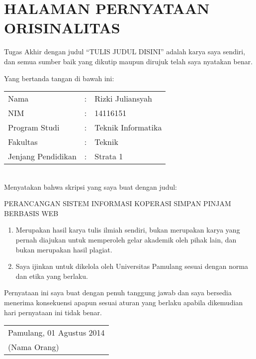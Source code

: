 %

\chapter*{\uppercase{HALAMAN PERNYATAAN ORISINALITAS}}
\vspace{1cm}
\noindent Tugas Akhir dengan judul “TULIS JUDUL DISINI” adalah karya saya sendiri, dan semua sumber baik yang dikutip maupun dirujuk telah saya nyatakan benar.

\noindent Yang bertanda tangan di bawah ini:
\renewcommand{\arraystretch}{1.5}
\begin{table}[ht]
\begin{adjustwidth}{-0.15cm}{}
	\begin{tabular}{lll}
		Nama & : & Rizki Juliansyah \\
		NIM & : & 14116151 \\
		Program Studi & : & Teknik Informatika \\
		Fakultas & : & Teknik \\
		Jenjang Pendidikan & : & Strata 1
	\end{tabular}
\end{adjustwidth}
\end{table} \\

\vspace{-1cm}
\noindent Menyatakan bahwa skripsi yang saya buat dengan judul:

\vspace{0.3cm}
\noindent PERANCANGAN SISTEM INFORMASI KOPERASI SIMPAN PINJAM BERBASIS WEB
\begin{enumerate}[nolistsep,leftmargin=0.5cm]
	\item Merupakan hasil karya tulis ilmiah sendiri, bukan merupakan karya yang pernah diajukan untuk memperoleh gelar akademik oleh pihak lain, dan bukan merupakan hasil plagiat.
	\item Saya ijinkan untuk dikelola oleh Universitas Pamulang sesuai dengan norma dan etika yang berlaku.
\end{enumerate}
Pernyataan ini saya buat dengan penuh tanggung jawab dan saya bersedia menerima konsekuensi apapun sesuai aturan yang berlaku apabila dikemudian hari pernyataan ini tidak benar.

\vspace{2cm}
\begin{table}[ht]
\begin{adjustwidth}{-0.15cm}{}
	\begin{tabular}{l}
	Pamulang, 01 Agustus 2014 \\[2cm]
	(Nama Orang)
	\end{tabular}
\end{adjustwidth}	
\end{table}

\newpage